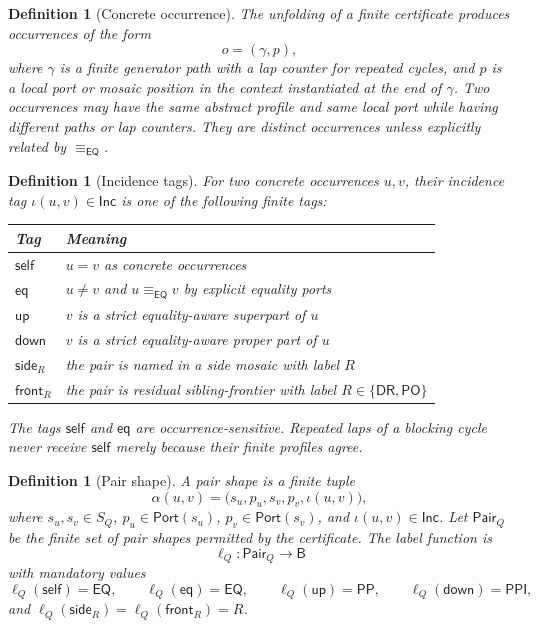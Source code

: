 \documentclass[11pt]{article}
\newtheorem{definition}[theorem]{Definition}
\newcommand{\Base}{\mathsf B}
\newcommand{\EQ}{\mathsf{EQ}}
\newcommand{\PP}{\mathsf{PP}}
\newcommand{\PPI}{\mathsf{PPI}}
\newcommand{\PO}{\mathsf{PO}}
\newcommand{\DR}{\mathsf{DR}}
\newcommand{\Port}{\mathsf{Port}}
\newcommand{\eqc}{\equiv_{\EQ}}
\newcommand{\Pair}{\mathsf{Pair}}
\newcommand{\Inc}{\mathsf{Inc}}
\newcommand{\self}{\mathsf{self}}
\newcommand{\eqtag}{\mathsf{eq}}
\newcommand{\up}{\mathsf{up}}
\newcommand{\down}{\mathsf{down}}
\newcommand{\side}{\mathsf{side}}
\newcommand{\front}{\mathsf{front}}
\begin{document}
\begin{definition}[Concrete occurrence]
The unfolding of a finite certificate produces occurrences of the form
\[
  o=(\gamma,p),
\]
where \(\gamma\) is a finite generator path with a lap counter for repeated cycles, and \(p\) is a local port or mosaic position in the context instantiated at the end of \(\gamma\).  Two occurrences may have the same abstract profile and same local port while having different paths or lap counters.  They are distinct occurrences unless explicitly related by \(\eqc\).
\end{definition}

\begin{definition}[Incidence tags]
For two concrete occurrences \(u,v\), their incidence tag \(\iota(u,v)\in\Inc\) is one of the following finite tags:
\begin{center}
\begin{tabular}{ll}
\toprule
Tag & Meaning \\
\midrule
\(\self\) & \(u=v\) as concrete occurrences \\
\(\eqtag\) & \(u\ne v\) and \(u\eqc v\) by explicit equality ports \\
\(\up\) & \(v\) is a strict equality-aware superpart of \(u\) \\
\(\down\) & \(v\) is a strict equality-aware proper part of \(u\) \\
\(\side_R\) & the pair is named in a side mosaic with label \(R\) \\
\(\front_R\) & the pair is residual sibling-frontier with label \(R\in\{\DR,\PO\}\) \\
\bottomrule
\end{tabular}
\end{center}
The tags \(\self\) and \(\eqtag\) are occurrence-sensitive.  Repeated laps of a blocking cycle never receive \(\self\) merely because their finite profiles agree.
\end{definition}

\begin{definition}[Pair shape]
A pair shape is a finite tuple
\[
  \alpha(u,v)=\bigl(s_u,p_u,s_v,p_v,\iota(u,v)\bigr),
\]
where \(s_u,s_v\in S_Q\), \(p_u\in\Port(s_u)\), \(p_v\in\Port(s_v)\), and \(\iota(u,v)\in\Inc\).  Let \(\Pair_Q\) be the finite set of pair shapes permitted by the certificate.  The label function is
\[
  \ell_Q:\Pair_Q\to\Base
\]
with mandatory values
\[
  \ell_Q(\self)=\EQ,
  \qquad
  \ell_Q(\eqtag)=\EQ,
  \qquad
  \ell_Q(\up)=\PP,
  \qquad
  \ell_Q(\down)=\PPI,
\]
and \(\ell_Q(\side_R)=\ell_Q(\front_R)=R\).
\end{definition}
\end{document}
